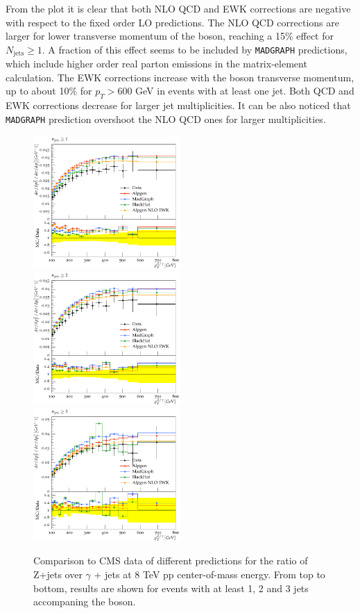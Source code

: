 \documentclass[11pt]{cernrep} \usepackage{graphicx,epsfig} 
\begin{document}
From the plot it is clear that both NLO QCD and EWK corrections are negative with respect to the fixed order LO
predictions. The NLO QCD corrections are larger for lower transverse momentum of the boson, reaching a 15\% effect for
$N_{\mathrm{jets}} \geq 1$. A fraction of this effect seems to be included by {\tt MADGRAPH} predictions, which include higher order
real parton emissions in the matrix-element calculation. The EWK corrections increase with the boson transverse
momentum, up to about 10\% for $p_T > 600$ GeV in events with at least one jet. Both QCD and EWK corrections decrease
for larger jet multiplicities. It can be also noticed that {\tt MADGRAPH} prediction overshoot the NLO QCD ones for
larger multiplicities. 


\begin{figure}
\begin{center}
\includegraphics[width=0.5\textwidth]{d07-x01-y01.pdf} \\
\includegraphics[width=0.5\textwidth]{d08-x01-y01.pdf} \\
\includegraphics[width=0.5\textwidth]{d08-x02-y01.pdf}
 \caption{Comparison to CMS data of different predictions for the ratio of Z+jets over $\gamma$ + jets at 8 TeV pp
   center-of-mass energy. From top to bottom, results are shown for events with at least 1, 2 and 3 jets accompaning the
   boson.}
\label{zgrdata}
\end{center}
\end{figure}
\end{document}
